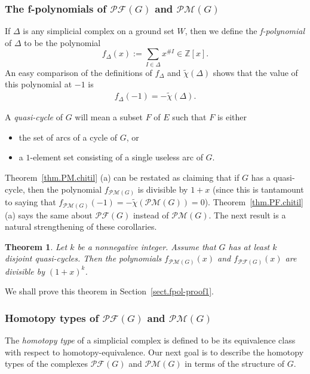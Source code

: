 \documentclass[12pt]{amsart}
\newtheorem{theorem}{Theorem}[section]
\theoremstyle{definition}
\newcommand{\ZZ}{\mathbb{Z}}
\newcommand{\tup}[1]{\left( #1 \right)}
\newcommand{\ive}[1]{\left[ #1 \right]}
\newcommand{\chitil}{\widetilde{\chi}}
\newcommand{\Pm}[1]{\mathcal{PM}\left(#1\right)}
\newcommand{\Pf}[1]{\mathcal{PF}\left(#1\right)}
\begin{document}
\subsubsection{\label{subsect.main.fpol}The f-polynomials of $\Pf{G}$ and $\Pm{G}$}

If $\Delta$ is any simplicial complex on a ground set $W$, then we define the \emph{f-polynomial} of $\Delta$ to be the polynomial
\[
f_\Delta\tup{x} := \sum_{I \in \Delta} x^{\# I} \in \ZZ\ive{x} .
\]
An easy comparison of the definitions of $f_\Delta$ and $\chitil\tup{\Delta}$ shows that the value of this polynomial at $-1$ is
\begin{align}
f_\Delta\tup{-1} = - \chitil\tup{\Delta} .
\label{eq.fDelta.-1}
\end{align}

A \textit{quasi-cycle} of $G$ will mean a subset $F$ of $E$ such that $F$ is either
\begin{itemize}
\item the set of arcs of a cycle of $G$, or
\item a $1$-element set consisting of a single useless arc of $G$.
\end{itemize}

Theorem~\ref{thm.PM.chitil} (a) can be restated as claiming that if $G$ has a quasi-cycle, then the polynomial $f_{\Pm{G}}$ is divisible by $1+x$ (since this is tantamount to saying that $f_{\Pm{G}}\tup{-1} = - \chitil\tup{\Pm{G}} = 0$).
Theorem~\ref{thm.PF.chitil} (a) says the same about $\Pf{G}$ instead of $\Pm{G}$.
The next result is a natural strengthening of these corollaries.

\begin{theorem} \label{thm.fpols.divis}
Let $k$ be a nonnegative integer.
Assume that $G$ has at least $k$ disjoint quasi-cycles.
Then the polynomials $f_{\Pm{G}}\tup{x}$ and $f_{\Pf{G}}\tup{x}$ are divisible by $\tup{1+x}^k$.
\end{theorem}

We shall prove this theorem in Section~\ref{sect.fpol-proof1}.

\subsubsection{\label{subsect.main.homtypes}Homotopy types of $\Pf{G}$ and $\Pm{G}$}

The \emph{homotopy type} of a simplicial complex is defined to be its equivalence class with respect to homotopy-equivalence.
Our next goal is to describe the homotopy types of the complexes $\Pf{G}$ and $\Pm{G}$ in terms of the structure of $G$.
\end{document}

